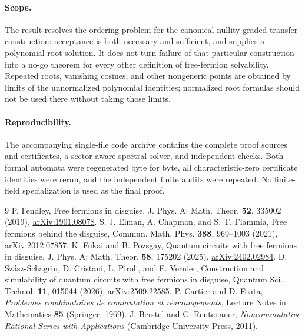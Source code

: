 \documentclass[10pt,letterpaper]{article}
\begin{document}
\paragraph{Scope.}
The result resolves the ordering problem for the canonical nullity-graded transfer construction: acceptance is both necessary and sufficient, and supplies a polynomial-root solution. It does not turn failure of that particular construction into a no-go theorem for every other definition of free-fermion solvability. Repeated roots, vanishing cosines, and other nongeneric points are obtained by limits of the unnormalized polynomial identities; normalized root formulas should not be used there without taking those limits.

\paragraph{Reproducibility.}
The accompanying single-file code archive contains the complete proof sources and certificates, a sector-aware spectral solver, and independent checks. Both formal automata were regenerated byte for byte, all characteristic-zero certificate identities were rerun, and the independent finite audits were repeated. No finite-field specialization is used as the final proof.

\begin{thebibliography}{9}\small
{} P. Fendley, Free fermions in disguise, J. Phys. A: Math. Theor. \textbf{52}, 335002 (2019), \href{https://arxiv.org/abs/1901.08078}{arXiv:1901.08078}.
 S. J. Elman, A. Chapman, and S. T. Flammia, Free fermions behind the disguise, Commun. Math. Phys. \textbf{388}, 969--1003 (2021), \href{https://arxiv.org/abs/2012.07857}{arXiv:2012.07857}.
 K. Fukai and B. Pozsgay, Quantum circuits with free fermions in disguise, J. Phys. A: Math. Theor. \textbf{58}, 175202 (2025), \href{https://arxiv.org/abs/2402.02984}{arXiv:2402.02984}.
 D. Sz\'asz-Schagrin, D. Cristani, L. Piroli, and E. Vernier, Construction and simulability of quantum circuits with free fermions in disguise, Quantum Sci. Technol. \textbf{11}, 015044 (2026), \href{https://arxiv.org/abs/2509.22585}{arXiv:2509.22585}.
 P. Cartier and D. Foata, \emph{Probl\`emes combinatoires de commutation et r\'earrangements}, Lecture Notes in Mathematics \textbf{85} (Springer, 1969).
 J. Berstel and C. Reutenauer, \emph{Noncommutative Rational Series with Applications} (Cambridge University Press, 2011).
\end{thebibliography}
\end{document}
